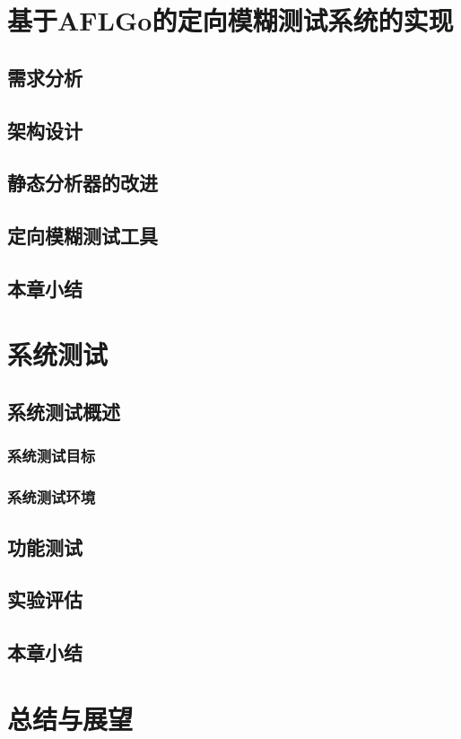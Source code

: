 \documentclass[bachelor]{njupthesis}
\begin{document}
\chapter{基于AFLGo的定向模糊测试系统的实现}
\section{需求分析}

\section{架构设计}
\section{静态分析器的改进}
\section{定向模糊测试工具}
\section{本章小结}

\chapter{系统测试}
\section{系统测试概述}
\subsection{系统测试目标}
\subsection{系统测试环境}
\section{功能测试}
\section{实验评估}
\section{本章小结}


\chapter{总结与展望}
\end{document}
